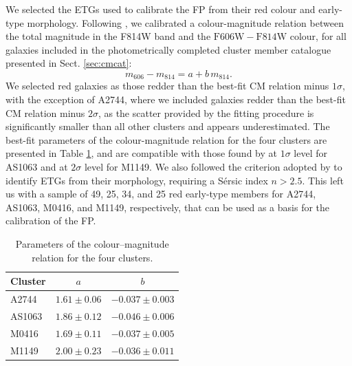 \documentclass{aa}
\begin{document}
We selected the ETGs used to calibrate the FP from their red colour and early-type morphology. Following \citet{tortorelli18,tortorelli23}, we calibrated a colour-magnitude relation between the total magnitude in the F814W band and the $\mathrm{F606W}-\mathrm{F814W}$ colour, for all galaxies included in the photometrically completed cluster member catalogue presented in Sect. \ref{sec:cmcat}:
\begin{equation}\label{eqcm}
    m_{606}-m_{814} = a + b \, m_{814}.
\end{equation}
We selected red galaxies as those redder than the best-fit CM relation minus $1\sigma$, with the exception of A2744, where we included galaxies redder than the best-fit CM relation minus $2\sigma$, as the scatter provided by the fitting procedure is significantly smaller than all other clusters and appears underestimated. The best-fit parameters of the colour-magnitude relation for the four clusters are presented in Table \ref{cm}, and are compatible with those found by \cite{tortorelli18} at $1\sigma$ level for AS1063 and at $2\sigma$ level for M1149. We also followed the criterion adopted by \citet{tortorelli18} to identify ETGs from their morphology, requiring a S{\'e}rsic index $n>2.5$. This left us with a sample of 49, 25, 34, and 25 red early-type members for A2744, AS1063, M0416, and M1149, respectively, that can be used as a basis for the calibration of the FP.

\begin{table}
\caption{\label{cm}Parameters of the colour--magnitude relation for the four clusters.}
\centering
\begin{tabular}{lcc}
\hline\hline
Cluster&$a$&$b$\\
\hline
A2744           & $1.61\pm0.06$     & $-0.037\pm0.003$ \\
AS1063           & $1.86\pm0.12$   & $-0.046\pm0.006$ \\
M0416 & $1.69\pm0.11$     & $-0.037\pm0.005$ \\
M1149        & $2.00\pm0.23$      & $-0.036\pm0.011$ \\
\hline
\end{tabular}
\end{table}
\end{document}

